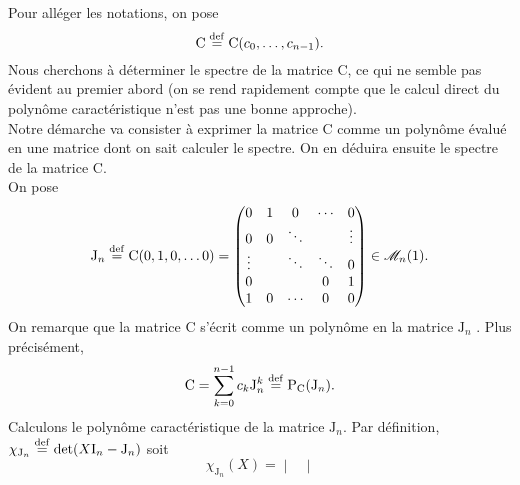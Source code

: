 \begin{demo}
    Pour alléger les notations, on pose 
    $$\mathrm{C} \defeq \mathrm{C}(c_0, \dots, c_{n-1}).$$
    Nous cherchons à déterminer le spectre de la matrice $\mathrm{C}$, ce qui ne semble pas évident au premier abord (on se rend rapidement compte que le calcul direct du polynôme caractéristique n'est pas une bonne approche). \\
    Notre démarche va consister à exprimer la matrice $\mathrm{C}$ comme un polynôme évalué en une matrice dont on sait calculer le spectre. On en déduira ensuite le spectre de la matrice $\mathrm{C}$. \\
    On pose 
    $$
    \mathrm{J}_n \defeq \mathrm{C}(0, 1, 0, \dots 0) = 
    \begin{pmatrix}
    0 & 1 & 0 & \cdots & 0 \\
    0 & 0 & \ddots & & \vdots \\
    \vdots & & \ddots & \ddots & 0 \\
    0 & & & 0 & 1 \\
    1 & 0 & \cdots & 0 & 0
    \end{pmatrix} \in \M_n(\R).
    $$
    On remarque que la matrice $\mathrm{C}$ s'écrit comme un polynôme en la matrice $\mathrm{J}_n$ \note. Plus précisément, 
    $$\mathrm{C} = \sum_{k=0}^{n-1} c_k \mathrm{J}_n^k \defeqright \mathrm{P}_{\mathrm{C}}(\mathrm{J}_n).$$
    Calculons le polynôme caractéristique de la matrice $\mathrm{J}_n$. Par définition, $\chi_{\mathrm{J}_n} \defeq \det(X \I_n - \mathrm{J}_n)$ soit 
    $$
        \chi_{\mathrm{J}_n}(X) = 
        \begin{vmatrix}

\end{vmatrix}$$
\end{demo}
